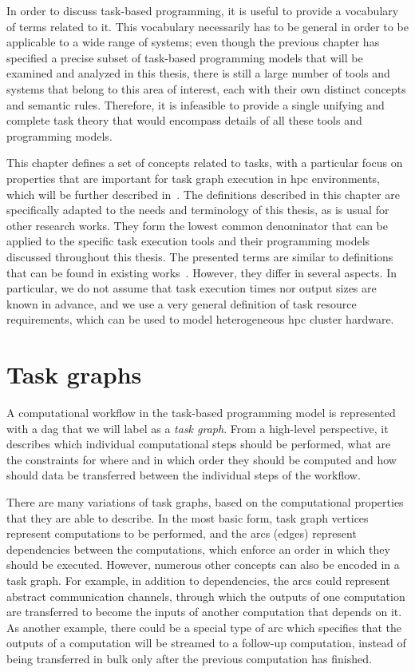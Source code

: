 In order to discuss task-based programming, it is useful to provide a vocabulary of terms related
to it. This vocabulary necessarily has to be general in order to be applicable to a wide range of
systems; even though the previous chapter has specified a precise subset of task-based programming
models that will be examined and analyzed in this thesis, there is still a large number of tools
and systems that belong to this area of interest, each with their own distinct concepts and
semantic rules. Therefore, it is infeasible to provide a single unifying and complete task theory
that would encompass details of all these tools and programming models.

This chapter defines a set of concepts related to tasks, with a particular focus on properties that
are important for task graph execution in \gls{hpc} environments, which will be
further described in~. The definitions described in this chapter are
specifically adapted to the needs and terminology of this thesis, as is usual for other research
works. They form the lowest common denominator that can be applied to the specific task execution
tools and their programming models discussed throughout this thesis. The presented terms are
similar to definitions that can be found in existing works~\cite{task_scheduling,hagras2003static,wang2018list}. However, they
differ in several aspects. In particular, we do not assume that task execution times nor output
sizes are known in advance, and we use a very general definition of task resource requirements,
which can be used to model heterogeneous \gls{hpc} cluster hardware.

\section{Task graphs}
\label{sec:task-graphs}
A computational workflow in the task-based programming model is represented with a
\gls{dag} that we will label as a \emph{task graph}. From a high-level
perspective, it describes which individual computational steps should be performed, what are the
constraints for where and in which order they should be computed and how should data be transferred
between the individual steps of the workflow.

There are many variations of task graphs, based on the computational properties that they are able
to describe. In the most basic form, task graph vertices represent computations to be performed,
and the arcs (edges) represent dependencies between the computations, which enforce an order in
which they should be executed. However, numerous other concepts can also be encoded in a task
graph. For example, in addition to dependencies, the arcs could represent abstract communication
channels, through which the outputs of one computation are transferred to become the inputs of
another computation that depends on it. As another example, there could be a special type of arc
which specifies that the outputs of a computation will be streamed to a follow-up computation,
instead of being transferred in bulk only after the previous computation has finished.

